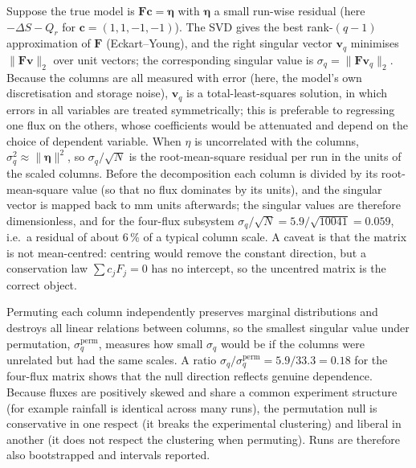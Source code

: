 \documentclass[preprint,12pt,authoryear]{elsarticle}
\begin{document}
\label{sec:svdtheory}
Suppose the true model is $\mathbf F\mathbf c=\boldsymbol\eta$ with $\boldsymbol\eta$ a small run-wise residual (here $-\Delta S-Q_r$ for $\mathbf c=(1,1,-1,-1)$). The SVD gives the best rank-$(q-1)$ approximation of $\mathbf F$ (Eckart--Young), and the right singular vector $\mathbf v_q$ minimises $\|\mathbf F\mathbf v\|_2$ over unit vectors; the corresponding singular value is $\sigma_q=\|\mathbf F\mathbf v_q\|_2$. Because the columns are all measured with error (here, the model's own discretisation and storage noise), $\mathbf v_q$ is a total-least-squares solution, in which errors in all variables are treated symmetrically; this is preferable to regressing one flux on the others, whose coefficients would be attenuated and depend on the choice of dependent variable. When $\eta$ is uncorrelated with the columns, $\sigma_q^2\approx\|\boldsymbol\eta\|^2$, so $\sigma_q/\sqrt N$ is the root-mean-square residual per run in the units of the scaled columns. Before the decomposition each column is divided by its root-mean-square value (so that no flux dominates by its units), and the singular vector is mapped back to mm units afterwards; the singular values are therefore dimensionless, and for the four-flux subsystem $\sigma_q/\sqrt N=5.9/\sqrt{10041}=0.059$, i.e.\ a residual of about 6\,\% of a typical column scale. A caveat is that the matrix is not mean-centred: centring would remove the constant direction, but a conservation law $\sum c_jF_j=0$ has no intercept, so the uncentred matrix is the correct object.

Permuting each column independently preserves marginal distributions and destroys all linear relations between columns, so the smallest singular value under permutation, $\sigma_q^{\mathrm{perm}}$, measures how small $\sigma_q$ would be if the columns were unrelated but had the same scales. A ratio $\sigma_q/\sigma_q^{\mathrm{perm}}=5.9/33.3=0.18$ for the four-flux matrix shows that the null direction reflects genuine dependence. Because fluxes are positively skewed and share a common experiment structure (for example rainfall is identical across many runs), the permutation null is conservative in one respect (it breaks the experimental clustering) and liberal in another (it does not respect the clustering when permuting). Runs are therefore also bootstrapped and intervals reported.
\end{document}
